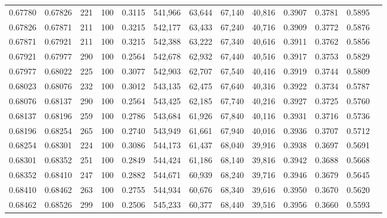 \begin{tabular}{rrrrrrrrrrrrr}
0.67780 & 0.67826 &   221 & 100 &                                     0.3115 & 541,966 &  63,644 &  67,140 &  40,816 & 0.3907 & 0.3781 & 0.5895 \\
0.67826 & 0.67871 &   211 & 100 &                                     0.3215 & 542,177 &  63,433 &  67,240 &  40,716 & 0.3909 & 0.3772 & 0.5876 \\
0.67871 & 0.67921 &   211 & 100 &                                     0.3215 & 542,388 &  63,222 &  67,340 &  40,616 & 0.3911 & 0.3762 & 0.5856 \\
0.67921 & 0.67977 &   290 & 100 &                                     0.2564 & 542,678 &  62,932 &  67,440 &  40,516 & 0.3917 & 0.3753 & 0.5829 \\
0.67977 & 0.68022 &   225 & 100 &                                     0.3077 & 542,903 &  62,707 &  67,540 &  40,416 & 0.3919 & 0.3744 & 0.5809 \\
0.68023 & 0.68076 &   232 & 100 &                                     0.3012 & 543,135 &  62,475 &  67,640 &  40,316 & 0.3922 & 0.3734 & 0.5787 \\
0.68076 & 0.68137 &   290 & 100 &                                     0.2564 & 543,425 &  62,185 &  67,740 &  40,216 & 0.3927 & 0.3725 & 0.5760 \\
0.68137 & 0.68196 &   259 & 100 &                                     0.2786 & 543,684 &  61,926 &  67,840 &  40,116 & 0.3931 & 0.3716 & 0.5736 \\
0.68196 & 0.68254 &   265 & 100 &                                     0.2740 & 543,949 &  61,661 &  67,940 &  40,016 & 0.3936 & 0.3707 & 0.5712 \\
0.68254 & 0.68301 &   224 & 100 &                                     0.3086 & 544,173 &  61,437 &  68,040 &  39,916 & 0.3938 & 0.3697 & 0.5691 \\
0.68301 & 0.68352 &   251 & 100 &                                     0.2849 & 544,424 &  61,186 &  68,140 &  39,816 & 0.3942 & 0.3688 & 0.5668 \\
0.68352 & 0.68410 &   247 & 100 &                                     0.2882 & 544,671 &  60,939 &  68,240 &  39,716 & 0.3946 & 0.3679 & 0.5645 \\
0.68410 & 0.68462 &   263 & 100 &                                     0.2755 & 544,934 &  60,676 &  68,340 &  39,616 & 0.3950 & 0.3670 & 0.5620 \\
0.68462 & 0.68526 &   299 & 100 &                                     0.2506 & 545,233 &  60,377 &  68,440 &  39,516 & 0.3956 & 0.3660 & 0.5593 \\

\end{tabular}
